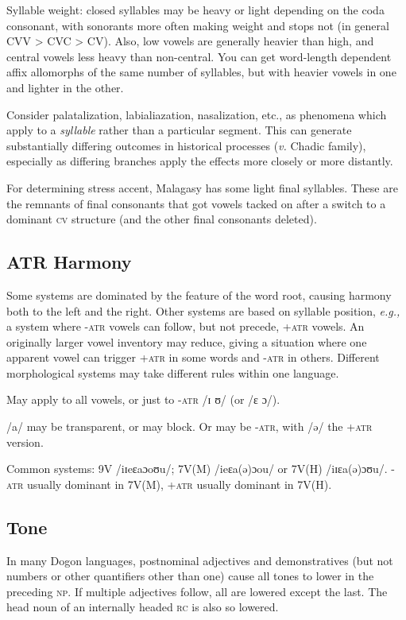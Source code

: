 \documentclass[11pt]{article}
\newcommand{\I}[1]{\textsc{#1}}   %
\begin{document}
Syllable weight: closed syllables may be heavy or light depending on
the coda consonant, with sonorants more often making weight and stops
not (in general CVV > CVC > CV).  Also, low vowels are generally
heavier than high, and central vowels less heavy than non-central. You
can get word-length dependent affix allomorphs of the same number of
syllables, but with heavier vowels in one and lighter in the other.

Consider palatalization, labialiazation, nasalization, etc., as
phenomena which apply to a \textit{syllable} rather than a particular
segment. This can generate substantially differing outcomes in
historical processes (\textit{v.} Chadic family), especially as
differing branches apply the effects more closely or more distantly. 

For determining stress accent, Malagasy has some light final
syllables. These are the remnants of final consonants that got vowels
tacked on after a switch to a dominant \I{cv} structure (and the other
final consonants deleted).

\subsection{ATR Harmony}
Some systems are dominated by the feature of the word root, causing
harmony both to the left and the right. Other systems are based on
syllable position, \textit{e.g.,} a system where \I{-atr} vowels can
follow, but not precede, \I{+atr} vowels. An originally larger vowel
inventory may reduce, giving a situation where one apparent vowel can
trigger \I{+atr} in some words and \I{-atr} in others. Different
morphological systems may take different rules within one language.

May apply to all vowels, or just to \I{-atr} /ɪ ʊ/ (or /ɛ ɔ/).

/a/ may be transparent, or may block. Or may be \I{-atr}, with /ə/ the
\I{+atr} version.

Common systems: 9V /iɪeɛaɔoʊu/; 7V(M) /ieɛa(ə)ɔou/ or 7V(H)
/iɪɛa(ə)ɔʊu/. \I{-atr} usually dominant in 7V(M), \I{+atr} usually
dominant in 7V(H).

\subsection{Tone}
In many Dogon languages, postnominal adjectives and demonstratives
(but not numbers or other quantifiers other than one) cause all tones
to lower in the preceding \I{np}.  If multiple adjectives follow, all
are lowered except the last. The head noun of an internally headed
\I{rc} is also so lowered.
\end{document}
